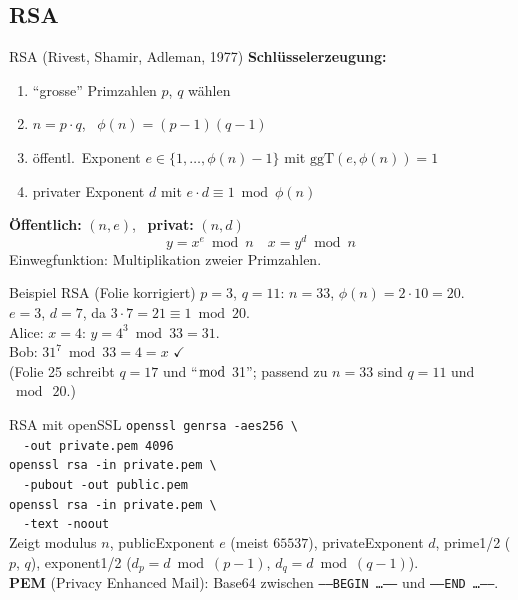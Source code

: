 \documentclass[a4paper, fontsize=7pt]{scrartcl}
\begin{document}
\subsection{RSA}

\begin{mainbox}{RSA (Rivest, Shamir, Adleman, 1977)}
\textbf{Schlüsselerzeugung:}
\begin{enumerate}
    \item ``grosse'' Primzahlen $p$, $q$ wählen
    \item $n = p \cdot q$, \ $\phi(n) = (p-1)(q-1)$
    \item öffentl.\ Exponent $e \in \{1, \ldots, \phi(n)-1\}$ mit
          $\text{ggT}(e, \phi(n)) = 1$
    \item privater Exponent $d$ mit $e \cdot d \equiv 1 \bmod \phi(n)$
\end{enumerate}
\textbf{Öffentlich:} $(n, e)$, \ \textbf{privat:} $(n, d)$
$$\boxed{y = x^e \bmod n}\quad \boxed{x = y^d \bmod n}$$
Einwegfunktion: Multiplikation zweier Primzahlen.
\end{mainbox}

\begin{subbox}{Beispiel RSA (Folie korrigiert)}
$p = 3$, $q = 11$: $n = 33$, $\phi(n) = 2 \cdot 10 = 20$.\\
$e = 3$, $d = 7$, da $3 \cdot 7 = 21 \equiv 1 \bmod 20$.\\
Alice: $x = 4$: $y = 4^3 \bmod 33 = 31$.\\
Bob: $31^7 \bmod 33 = 4 = x$ $\checkmark$\\
(Folie 25 schreibt $q = 17$ und ``$\bmod$ 31''; passend zu $n = 33$ sind
$q = 11$ und $\bmod\ 20$.)
\end{subbox}

\begin{subbox}{RSA mit openSSL}
\texttt{openssl genrsa -aes256 \textbackslash}\\
\texttt{\ \ -out private.pem 4096}\\
\texttt{openssl rsa -in private.pem \textbackslash}\\
\texttt{\ \ -pubout -out public.pem}\\
\texttt{openssl rsa -in private.pem \textbackslash}\\
\texttt{\ \ -text -noout}\\[2pt]
Zeigt modulus $n$, publicExponent $e$ (meist $65537$), privateExponent $d$,
prime1/2 ($p$, $q$), exponent1/2 ($d_p = d \bmod (p-1)$,
$d_q = d \bmod (q-1)$).\\
\textbf{PEM} (Privacy Enhanced Mail): Base64 zwischen
\texttt{-----BEGIN \ldots-----} und \texttt{-----END \ldots-----}.
\end{subbox}
\end{document}
